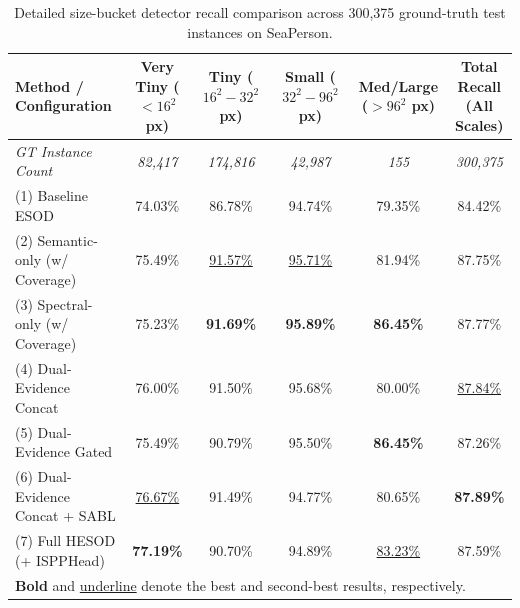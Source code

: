 \begin{table}[t]
\centering
\caption{Detailed size-bucket detector recall comparison across 300,375 ground-truth test instances on SeaPerson.}
\label{tab:size_buckets}
\footnotesize
\setlength{\tabcolsep}{8pt}
\begin{tabular}{lccccc}
\toprule
\textbf{Method / Configuration} & \shortstack{\textbf{Very Tiny}\\($<16^2$ px)} & \shortstack{\textbf{Tiny}\\($16^2-32^2$ px)} & \shortstack{\textbf{Small}\\($32^2-96^2$ px)} & \shortstack{\textbf{Med/Large}\\($>96^2$ px)} & \shortstack{\textbf{Total Recall}\\(All Scales)} \\
\midrule
\textit{GT Instance Count} & \textit{82,417} & \textit{174,816} & \textit{42,987} & \textit{155} & \textit{300,375} \\
\midrule
(1) Baseline ESOD \cite{ESOD}            & 74.03\% & 86.78\% & 94.74\% & 79.35\% & 84.42\% \\
(2) Semantic-only (w/ Coverage)          & 75.49\% & \underline{91.57\%} & \underline{95.71\%} & 81.94\% & 87.75\% \\
(3) Spectral-only (w/ Coverage)          & 75.23\% & \textbf{91.69\%} & \textbf{95.89\%} & \textbf{86.45\%} & 87.77\% \\
(4) Dual-Evidence Concat                 & 76.00\% & 91.50\% & 95.68\% & 80.00\% & \underline{87.84\%} \\
(5) Dual-Evidence Gated                  & 75.49\% & 90.79\% & 95.50\% & \textbf{86.45\%} & 87.26\% \\
(6) Dual-Evidence Concat + SABL          & \underline{76.67\%} & 91.49\% & 94.77\% & 80.65\% & \textbf{87.89\%} \\
(7) Full HESOD (+ ISPPHead)              & \textbf{77.19\%} & 90.70\% & 94.89\% & \underline{83.23\%} & 87.59\% \\
\bottomrule
\multicolumn{6}{l}{\scriptsize \textbf{Bold} and \underline{underline} denote the best and second-best results, respectively.}
\end{tabular}
\end{table}

